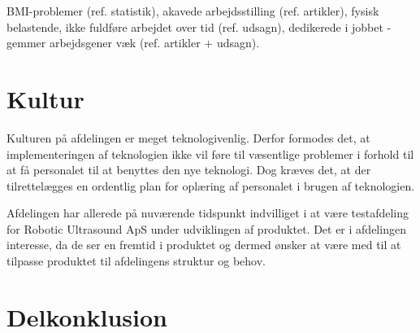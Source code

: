 BMI-problemer (ref. statistik), akavede arbejdsstilling (ref. artikler), fysisk belastende, ikke fuldføre arbejdet over tid (ref. udsagn), dedikerede i jobbet - gemmer arbejdsgener væk (ref. artikler + udsagn).

\section{Kultur}
Kulturen på afdelingen er meget teknologivenlig. Derfor formodes det, at implementeringen af teknologien ikke vil føre til væsentlige problemer i forhold til at få personalet til at benyttes den nye teknologi. Dog kræves det, at der tilrettelægges en ordentlig plan for oplæring af personalet i brugen af teknologien. 

Afdelingen har allerede på nuværende tidspunkt indvilliget i at være testafdeling for Robotic Ultrasound ApS under udviklingen af produktet. Det er i afdelingen interesse, da de ser en fremtid i produktet og dermed ønsker at være med til at tilpasse produktet til afdelingens struktur og behov.   

\section{Delkonklusion}

